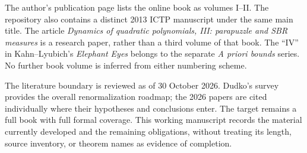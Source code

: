 The author's publication page lists the online book as volumes I--II.
The repository also contains a distinct 2013 ICTP manuscript under the
same main title.  The article \emph{Dynamics of quadratic polynomials,
III: parapuzzle and SBR measures} is a research paper, rather than a third
volume of that book.  The ``IV'' in Kahn--Lyubich's \emph{Elephant Eyes}
belongs to the separate \emph{A priori bounds} series.  No further book
volume is inferred from either numbering scheme.

The literature boundary is reviewed as of 30 October 2026.
Dudko's survey~\cite{DudkoMLC} provides the overall renormalization
roadmap; the 2026 papers are cited individually where their hypotheses and
conclusions enter.  The target remains a full book with full formal
coverage.  This working manuscript records the material currently
developed and the remaining obligations, without treating its length,
source inventory, or theorem names as evidence of completion.

